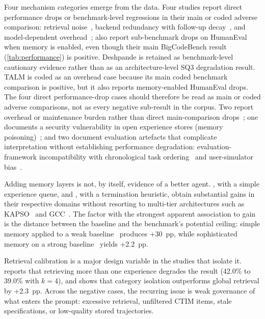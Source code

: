 Four mechanism categories emerge from the data.
Four studies report direct performance drops or benchmark-level
regressions in their main or coded adverse comparison:
retrieval noise~\citep{lindenbauer2025ctimrover,chen2025sweexp},
backend redundancy with follow-up decay~\citep{deshpande2025memtrack},
and model-dependent overhead~\citep{xia2025livesweagent};
\citet{shen2025talm} also report sub-benchmark drops on HumanEval
when memory is enabled, even though their main BigCodeBench result
(\autoref{tab:performance}) is positive.
Deshpande is retained as benchmark-level cautionary evidence rather
than as an architecture-level SQ3 degradation result.
TALM is coded as an overhead case because its main coded benchmark
comparison is positive, but it also reports memory-enabled HumanEval
drops.
The four direct performance-drop cases should therefore be read as main
or coded adverse comparisons, not as every negative sub-result in the
corpus.
Two report overhead or maintenance burden rather than direct
main-comparison drops~\citep{shen2025talm,vasilopoulos2026codified};
one documents a security vulnerability in open experience stores
(memory poisoning)~\citep{srivastava2025memorygraft};
and two document evaluation artefacts that complicate interpretation
without establishing performance degradation:
evaluation-framework incompatibility with chronological task
ordering~\citep{joshi2025swebenchcl} and user-simulator
bias~\citep{zhou2025tomswe}.

Adding memory layers is not, by itself, evidence of a better agent.
\citet{zhang2025accelopt}, with a simple experience queue, and
\citet{guo2026eet}, with a termination heuristic, obtain substantial
gains in their respective domains without resorting to multi-tier
architectures such as KAPSO~\citep{nadafian2026kapso} and
GCC~\citep{wu2025gcc}.
The factor with the strongest apparent association to gain is the
distance between the baseline and the benchmark's potential ceiling:
simple memory applied to a weak
baseline~\citep{zhang2025darwingodel} produces +30~pp, while
sophisticated memory on a strong
baseline~\citep{chen2025sweexp} yields +2.2~pp.

Retrieval calibration is a major design variable in the studies that
isolate it.
\citet{chen2025sweexp} reports that retrieving more than one experience
degrades the result (42.0\% to 39.0\% with $k = 4$), and
\citet{shen2026structurally} shows that category isolation outperforms
global retrieval by +2.3~pp.
Across the negative cases, the recurring issue is weak governance of
what enters the prompt:
excessive retrieval, unfiltered CTIM items, stale specifications, or
low-quality stored trajectories.

